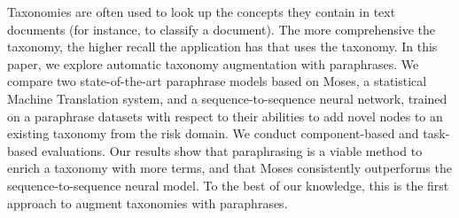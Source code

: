 Taxonomies are often used to look up the concepts they contain in text documents (for instance, to classify a document). The more comprehensive the taxonomy, the higher recall the application has that uses the taxonomy. In this paper, we explore automatic taxonomy augmentation with paraphrases. We compare two state-of-the-art paraphrase models based on Moses, a statistical Machine Translation system, and a sequence-to-sequence neural network, trained on a paraphrase datasets with respect to their abilities to add novel nodes to an existing taxonomy from the risk domain. We conduct component-based and task-based evaluations. Our results show that paraphrasing is a viable method to enrich a taxonomy with more terms, and that Moses consistently outperforms the sequence-to-sequence neural model. To the best of our knowledge, this is the first approach to augment taxonomies with paraphrases.
